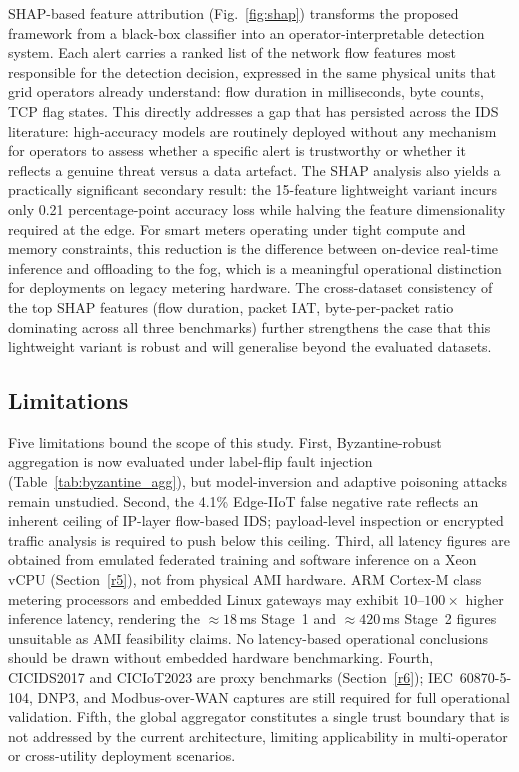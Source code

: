 \documentclass[sensors,article,submit,pdftex,moreauthors]{Definitions/mdpi}
\begin{document}
SHAP-based feature attribution (Fig.~\ref{fig:shap}) transforms the proposed framework from a black-box classifier into an operator-interpretable detection system. Each alert carries a ranked list of the network flow features most responsible for the detection decision, expressed in the same physical units that grid operators already understand: flow duration in milliseconds, byte counts, TCP flag states. This directly addresses a gap that has persisted across the IDS literature: high-accuracy models are routinely deployed without any mechanism for operators to assess whether a specific alert is trustworthy or whether it reflects a genuine threat versus a data artefact. The SHAP analysis also yields a practically significant secondary result: the 15-feature lightweight variant incurs only 0.21 percentage-point accuracy loss while halving the feature dimensionality required at the edge. For smart meters operating under tight compute and memory constraints, this reduction is the difference between on-device real-time inference and offloading to the fog, which is a meaningful operational distinction for deployments on legacy metering hardware. The cross-dataset consistency of the top SHAP features (flow duration, packet IAT, byte-per-packet ratio dominating across all three benchmarks) further strengthens the case that this lightweight variant is robust and will generalise beyond the evaluated datasets.

\subsection{Limitations}

Five limitations bound the scope of this study. First, Byzantine-robust aggregation is now evaluated under label-flip fault injection (Table~\ref{tab:byzantine_agg}), but model-inversion and adaptive poisoning attacks remain unstudied. Second, the 4.1\% Edge-IIoT false negative rate reflects an inherent ceiling of IP-layer flow-based IDS; payload-level inspection or encrypted traffic analysis is required to push below this ceiling. Third, all latency figures are obtained from emulated federated training and software inference on a Xeon vCPU (Section~\ref{r5}), not from physical AMI hardware. ARM Cortex-M class metering processors and embedded Linux gateways may exhibit $10$--$100\times$ higher inference latency, rendering the ${\approx}18$\,ms Stage~1 and ${\approx}420$\,ms Stage~2 figures unsuitable as AMI feasibility claims. No latency-based operational conclusions should be drawn without embedded hardware benchmarking. Fourth, CICIDS2017 and CICIoT2023 are proxy benchmarks (Section~\ref{r6}); IEC~60870-5-104, DNP3, and Modbus-over-WAN captures are still required for full operational validation. Fifth, the global aggregator constitutes a single trust boundary that is not addressed by the current architecture, limiting applicability in multi-operator or cross-utility deployment scenarios.
\end{document}
